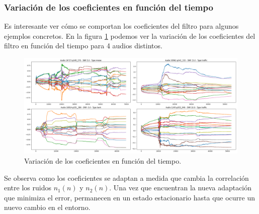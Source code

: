\subsubsection{Variación de los coeficientes en función del tiempo}

Es interesante ver cómo se comportan los coeficientes del filtro para algunos ejemplos concretos. En la figura \ref{fig:ch6_variacion_temporal_de_coeficientes}  podemos ver la variación de los coeficientes del filtro en función del tiempo para 4 audios distintos. 

\begin{figure}
	\centering
	\centerline{\includegraphics[scale=0.35]{images/ch6/weights.png}}
	\caption{Variación de los coeficientes en función del tiempo.}
	\label{fig:ch6_variacion_temporal_de_coeficientes}
\end{figure}

Se observa como los coeficientes se adaptan a medida que cambia la correlación entre los ruidos $n_1(n)$ y $n_2(n)$. Una vez que encuentran la nueva adaptación que minimiza el error, permanecen en un estado estacionario hasta que ocurre un nuevo cambio en el entorno.